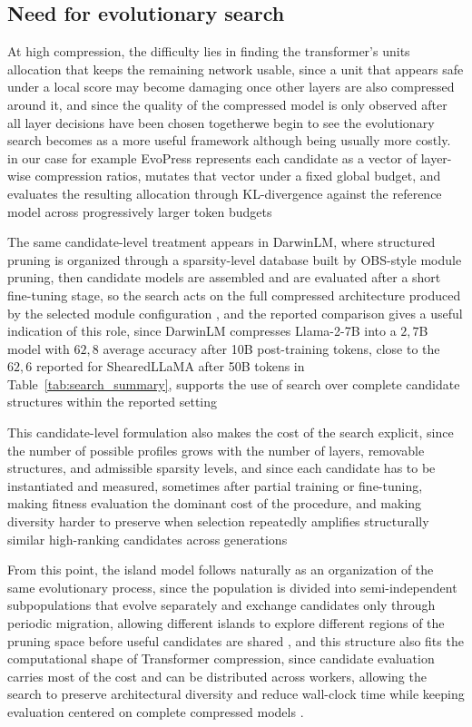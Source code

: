 \subsection{Need for evolutionary search}
\label{subsec:evolutionary_search_need}

At high compression, the difficulty lies in finding the transformer's units allocation that keeps the remaining network usable, since a unit that appears safe under a local score may become damaging once other layers are also compressed around it, and since the quality of the compressed model is only observed after all layer decisions have been chosen togetherwe begin to see the evolutionary search becomes as a more useful framework although being usually more costly. in our case for example EvoPress represents each candidate as a vector of layer-wise compression ratios, mutates that vector under a fixed global budget, and evaluates the resulting allocation through KL-divergence against the reference model across progressively larger token budgets \cite{evopress2024}

The same candidate-level treatment appears in DarwinLM, where structured pruning is organized through a sparsity-level database built by OBS-style module pruning, then candidate models are assembled and are evaluated after a short fine-tuning stage, so the search acts on the full compressed architecture produced by the selected module configuration \cite{darwinlm2025}, and the reported comparison gives a useful indication of this role, since DarwinLM compresses Llama-2-7B into a $2{,}7$B model with $62{,}8$ average accuracy after 10B post-training tokens, close to the $62{,}6$ reported for ShearedLLaMA after 50B tokens in Table~\ref{tab:search_summary}, supports the use of search over complete candidate structures within the reported setting

This candidate-level formulation also makes the cost of the search explicit, since the number of possible profiles grows with the number of layers, removable structures, and admissible sparsity levels, and since each candidate has to be instantiated and measured, sometimes after partial training or fine-tuning, making fitness evaluation the dominant cost of the procedure, and making diversity harder to preserve when selection repeatedly amplifies structurally similar high-ranking candidates across generations \cite{cantupaz2000efficient,luque2011parallel}

From this point, the island model follows naturally as an organization of the same evolutionary process, since the population is divided into semi-independent subpopulations that evolve separately and exchange candidates only through periodic migration, allowing different islands to explore different regions of the pruning space before useful candidates are shared \cite{cantupaz2000efficient,luque2011parallel,meng2018dynamicisland}, and this structure also fits the computational shape of Transformer compression, since candidate evaluation carries most of the cost and can be distributed across workers, allowing the search to preserve architectural diversity and reduce wall-clock time while keeping evaluation centered on complete compressed models \cite{harada2021distributedpga}.
